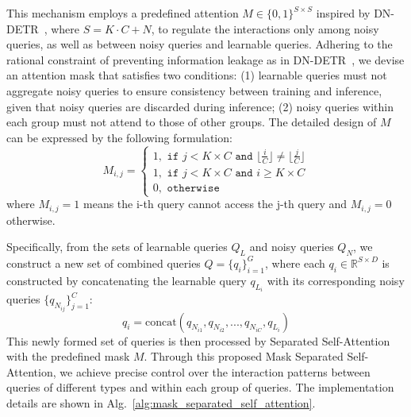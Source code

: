 This mechanism employs a predefined attention $M \in \{0,1\}^{S \times S}$ inspired by DN-DETR~\cite{DN-DETR}, where $S = K \cdot C + N$, to regulate the interactions only among noisy queries, as well as between noisy queries and learnable queries. Adhering to the rational constraint of preventing information leakage as in DN-DETR~\cite{DN-DETR}, we devise an attention mask that satisfies two conditions: (1) learnable queries must not aggregate noisy queries to ensure consistency between training and inference, given that noisy queries are discarded during inference; (2) noisy queries within each group must not attend to those of other groups.
The detailed design of $M$ can be expressed by the following formulation:
\begin{equation}
    M_{i,j} = 
     \left\{
     \begin{array}{l}
          1, \texttt{ if } j < K\times C \texttt{ and } \lfloor\frac{i}{C}\rfloor \neq \lfloor\frac{j}{C}\rfloor \\
          1, \texttt{ if } j < K\times C \texttt{ and } i \geq K\times C\\
          0, \texttt{ otherwise}
     \end{array}
     \right.
\end{equation}
where $M_{i,j}=1$ means the i-th query cannot access the j-th query and $M_{i,j}=0$ otherwise.

Specifically, from the sets of learnable queries $Q_L$ and noisy queries $Q_N$, we construct a new set of combined queries $Q = \{q_i\}_{i=1}^G$, where each $q_i \in \mathbb{R}^{S \times D}$ is constructed by concatenating the learnable query $q_{L_i}$ with its corresponding noisy queries $\{q_{N_{ij}}\}_{j=1}^C$:
\begin{equation}
    q_i = \text{concat}( q_{N_{i1}}, q_{N_{i2}}, ..., q_{N_{iC}},q_{L_i})
    \label{eq:q_i}
\end{equation}
This newly formed set of queries is then processed by Separated Self-Attention with the predefined mask $M$. Through this proposed Mask Separated Self-Attention, we achieve precise control over the interaction patterns between queries of different types and within each group of queries. The implementation details are shown in Alg.~\ref{alg:mask_separated_self_attention}.

